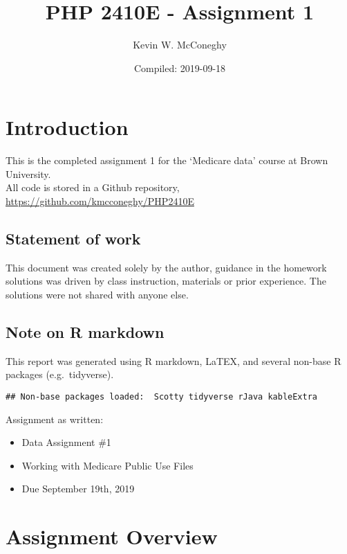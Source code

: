 \documentclass[]{article}
\title{PHP 2410E - Assignment 1}
\author{Kevin W. McConeghy}
\date{Compiled: 2019-09-18}
\providecommand{\tightlist}{%
  \setlength{\itemsep}{0pt}\setlength{\parskip}{0pt}}
\begin{document}
\maketitle

{
\setcounter{tocdepth}{2}
\tableofcontents
}
\newpage

\hypertarget{introduction}{%
\section{Introduction}\label{introduction}}

This is the completed assignment 1 for the `Medicare data' course at
Brown University.\\
All code is stored in a Github repository,
\url{https://github.com/kmcconeghy/PHP2410E}

\hypertarget{statement-of-work}{%
\subsection{Statement of work}\label{statement-of-work}}

This document was created solely by the author, guidance in the homework
solutions was driven by class instruction, materials or prior
experience. The solutions were not shared with anyone else.

\hypertarget{note-on-r-markdown}{%
\subsection{Note on R markdown}\label{note-on-r-markdown}}

This report was generated using R markdown, LaTEX, and several non-base
R packages (e.g.~tidyverse).

\begin{verbatim}
## Non-base packages loaded:  Scotty tidyverse rJava kableExtra
\end{verbatim}

Assignment as written:

\begin{itemize}
\tightlist
\item
  Data Assignment \#1
\item
  Working with Medicare Public Use Files
\item
  Due September 19th, 2019
\end{itemize}

\hypertarget{assignment-overview}{%
\section{Assignment Overview}\label{assignment-overview}}
\end{document}

